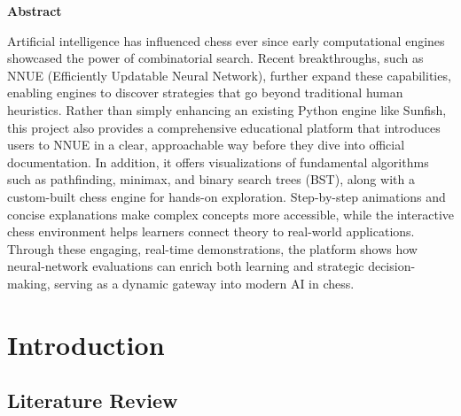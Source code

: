 \documentclass[12pt,a4paper]{article}
\begin{document}
  



\tableofcontents

\newpage
{}
{}

\begin{center}
    \LARGE \bfseries Abstract
\end{center}

\begin{center}
    \parbox{0.9\textwidth}{
         Artificial intelligence has influenced chess ever since early computational engines showcased the power of combinatorial search. Recent breakthroughs, such as NNUE (Efficiently Updatable Neural Network), further expand these capabilities, enabling engines to discover strategies that go beyond traditional human heuristics. Rather than simply enhancing an existing Python engine like Sunfish, this project also provides a comprehensive educational platform that introduces users to NNUE in a clear, approachable way before they dive into official documentation. In addition, it offers visualizations of fundamental algorithms such as pathfinding, minimax, and binary search trees (BST), along with a custom-built chess engine for hands-on exploration. Step-by-step animations and concise explanations make complex concepts more accessible, while the interactive chess environment helps learners connect theory to real-world applications. Through these engaging, real-time demonstrations, the platform shows how neural-network evaluations can enrich both learning and strategic decision-making, serving as a dynamic gateway into modern AI in chess.
    }
\end{center}


\section{Introduction}
\label{sec:intro}


\subsection{Literature Review}
\label{sec:lit_review}
\end{document}
